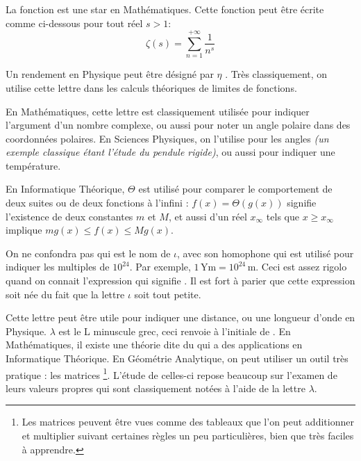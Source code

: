 \cadre{$\zeta$} La fonction  est une star en Mathématiques. Cette fonction peut être écrite comme ci-dessous pour tout réel $s > 1$:
\begin{equation}
	\zeta(s) = \sum_{n=1}^{+\infty} \frac{1}{n^s}
\end{equation}


\vspace{-0.3em}

\cadre{$\eta$} Un rendement en Physique peut être désigné par $\eta$ . Très classiquement, on utilise cette lettre dans les calculs théoriques de limites de fonctions.


\cadre{$\theta$} En Mathématiques, cette lettre est classiquement utilisée pour indiquer l'argument d’un nombre complexe, ou aussi pour noter un angle polaire dans des coordonnées polaires. En Sciences Physiques, on l'utilise pour les angles \emph{(un exemple classique étant l'étude du pendule rigide)}, ou aussi pour indiquer une température.


\cadre{$\Theta$} En Informatique Théorique, $\Theta$ est utilisé pour comparer le comportement de deux suites ou de deux fonctions à l'infini : $f(x) = \Theta\left(g(x)\right)$ signifie l'existence de deux constantes $m$ et $M$, et aussi d'un réel $x_\infty$ tels que $x \geqslant x_\infty$
implique $m g(x) \leqslant f(x) \leqslant M g(x)$.


\cadre{$\iota$} On ne confondra pas  qui est le nom de $\iota$, avec son homophone  qui est utilisé pour indiquer les multiples de $10^{24}$. Par exemple, $1 \, \si{\yotta\metre} = 10^{24} \, \si{\metre}$. Ceci est assez rigolo quand on connait l'expression  qui signifie . Il est fort à parier que cette expression soit née du fait que la lettre $\iota$ soit tout petite.


\cadre{$\lambda$} Cette lettre peut être utile pour indiquer une distance, ou une longueur d'onde en Physique. $\lambda$ est le L minuscule grec, ceci renvoie à l'initiale de .
En Mathématiques, il existe une théorie dite du  qui a des applications en Informatique Théorique.
En Géométrie Analytique, on peut utiliser un outil très pratique : les matrices
	\footnote{Les matrices peuvent être vues comme des tableaux que l'on peut additionner et multiplier suivant certaines règles un peu particulières, bien que très faciles à apprendre.}.
L'étude de celles-ci repose beaucoup sur l'examen de leurs valeurs propres qui sont classiquement notées à l'aide de la lettre $\lambda$.



